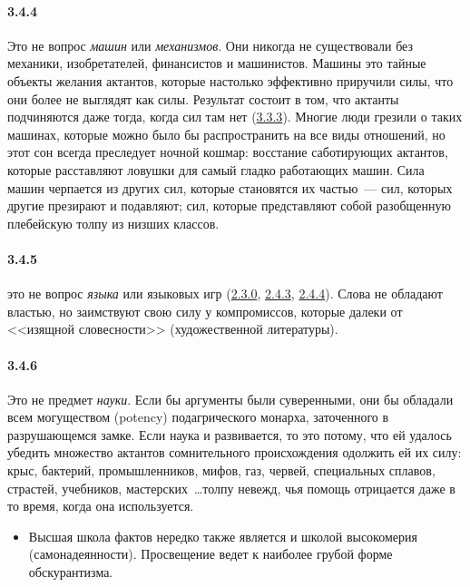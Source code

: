 \paragraph{3.4.4}\hypertarget{par:3.4.4}{} Это не вопрос {\itshape машин} или {\itshape механизмов}. Они никогда не существовали без механики, изобретателей, финансистов и машинистов. Машины это тайные объекты желания актантов, которые настолько эффективно приручили силы, что они более не выглядят как
силы. Результат состоит в том, что актанты подчиняются даже тогда, когда сил там нет (\hyperlink{par:3.3.3}{3.3.3}).
Многие люди грезили о таких машинах, которые можно было бы распространить на все виды отношений, но этот сон всегда преследует ночной кошмар: восстание саботирующих актантов, которые расставляют ловушки для самый гладко работающих машин. Сила машин черпается из других сил, которые становятся их частью~--- сил, которых другие презирают и подавляют; сил, которые представляют собой разобщенную плебейскую толпу из низших классов.

\paragraph{3.4.5}\hypertarget{par:3.4.5}{} это не вопрос {\itshape языка} или языковых игр (\hyperlink{par:2.3.0}{2.3.0}, \hyperlink{par:2.4.3}{2.4.3}, \hyperlink{par:2.4.4}{2.4.4}). Слова не обладают властью, но заимствуют свою силу у компромиссов, которые далеки от <<изящной словесности>> (художественной литературы).

\paragraph{3.4.6}\hypertarget{par:3.4.6}{} Это не предмет {\itshape науки}. Если бы аргументы были суверенными, они бы обладали всем могуществом (potency) подагрического монарха, заточенного в разрушающемся замке. Если наука и развивается, то это потому, что ей удалось убедить множество актантов сомнительного происхождения одолжить ей их силу: крыс, бактерий, промышленников, мифов, газ, червей, специальных сплавов, страстей, учебников, мастерских~\ldots толпу невежд, чья помощь отрицается даже в то время, когда она используется. 
	\begin{itemize}
	\item 
	Высшая школа фактов нередко также является и школой высокомерия (самонадеянности). Просвещение ведет к наиболее грубой форме обскурантизма.
	\end{itemize}

